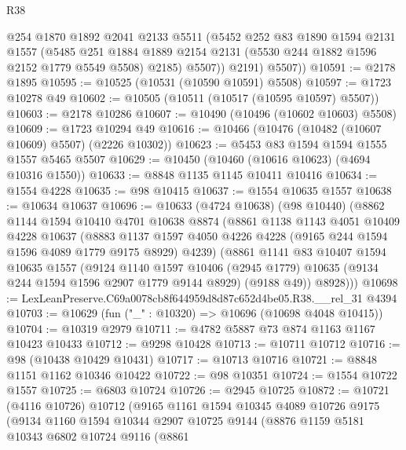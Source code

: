 \begin{lexlean}{R38}
\begin{coremodule}
            @254
            @1870
            @1892
            @2041
            @2133
            @5511
            (@5452
              @252
              @83
              @1890
              @1594
              @2131
              @1557
              (@5485
                @251
                @1884
                @1889
                @2154
                @2131
                (@5530 @244 @1882 @1596 @2152 @1779 @5549 @5508)
                @2185)
              @5507))
          @2191)
        @5507))
@10591 := @2178 @1895
@10595 := @10525 (@10531 (@10590 @10591) @5508)
@10597 := @1723 @10278 @49
@10602 := @10505 (@10511 (@10517 (@10595 @10597) @5507))
@10603 := @2178 @10286
@10607 := @10490 (@10496 (@10602 @10603) @5508)
@10609 := @1723 @10294 @49
@10616 := @10466 (@10476 (@10482 (@10607 @10609) @5507) (@2226 @10302))
@10623 := @5453 @83 @1594 @1594 @1555 @1557 @5465 @5507
@10629 := @10450 (@10460 (@10616 @10623) (@4694 @10316 @1550))
@10633 := @8848 @1135 @1145 @10411 @10416
@10634 := @1554 @4228
@10635 := @98 @10415
@10637 := @1554 @10635 @1557
@10638 := @10634 @10637
@10696 := @10633
    (@4724 @10638)
    (@98 @10440)
    (@8862
      @1144
      @1594
      @10410
      @4701
      @10638
      @8874
      (@8861
        @1138
        @1143
        @4051
        @10409
        @4228
        @10637
        (@8883 @1137 @1597 @4050 @4226 @4228 (@9165 @244 @1594 @1596 @4089 @1779 @9175 @8929) @4239)
        (@8861
          @1141
          @83
          @10407
          @1594
          @10635
          @1557
          (@9124
            @1140
            @1597
            @10406
            (@2945 @1779)
            @10635
            (@9134 @244 @1594 @1596 @2907 @1779 @9144 @8929)
            (@9188 @49))
          @8928)))
@10698 := LexLeanPreserve.C69a0078cb8f644959d8d87c652d4be05.R38.__rel_31 @4394
@10703 := @10629 (fun ("_" : @10320) => @10696 (@10698 @4048 @10415))
@10704 := @10319 @2979
@10711 := @4782 @5887 @73 @874 @1163 @1167 @10423 @10433
@10712 := @9298 @10428
@10713 := @10711 @10712
@10716 := @98 (@10438 @10429 @10431)
@10717 := @10713 @10716
@10721 := @8848 @1151 @1162 @10346 @10422
@10722 := @98 @10351
@10724 := @1554 @10722 @1557
@10725 := @6803 @10724
@10726 := @2945 @10725
@10872 := @10721
    (@4116 @10726)
    @10712
    (@9165
      @1161
      @1594
      @10345
      @4089
      @10726
      @9175
      (@9134
        @1160
        @1594
        @10344
        @2907
        @10725
        @9144
        (@8876
          @1159
          @5181
          @10343
          @6802
          @10724
          @9116
          (@8861

\end{coremodule}
\end{lexlean}
